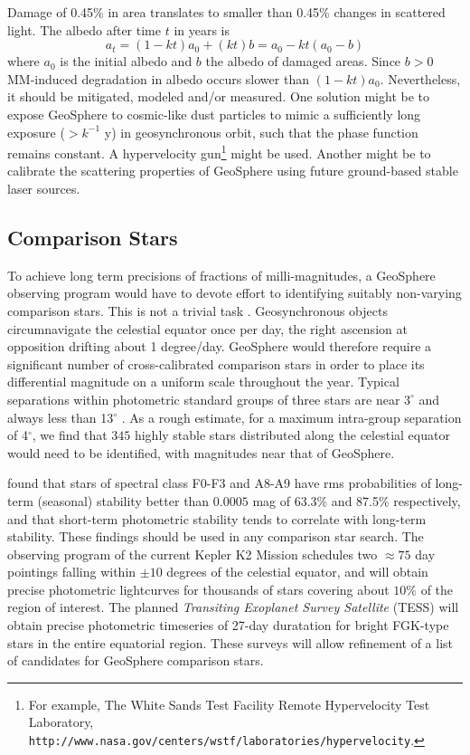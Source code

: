 \documentclass[useAMS,usenatbib]{mn2e}
\newcommand{\be}[1]{\begin{equation} \label{eq:#1}}
\newcommand{\ee}{\end{equation}}
\newcommand\name{LAMBERT}
\renewcommand\name{GeoSphere}
\begin{document}
Damage of 0.45\% in area translates to smaller than 0.45\% 
changes in scattered light.  
The albedo after time $t$ in years is
\be{change}
a_t = (1 - kt) a_0 + (kt) b = a_0 - kt(a_0-b)
\ee
%
where $a_0$ is the initial albedo and $b$ the albedo of damaged
areas.  Since $b > 0$ MM-induced degradation in albedo occurs slower than
$(1-kt) a_0$.  Nevertheless, it should be mitigated, modeled and/or
measured. One solution might be to expose \name{} to cosmic-like dust
particles to mimic a sufficiently long exposure ($>k^{-1}$ y) in
geosynchronous orbit, such that the phase function remains constant.
A hypervelocity gun\footnote{For example, The White Sands Test
  Facility Remote Hypervelocity Test Laboratory, {\tt
    http://www.nasa.gov/\-centers/wstf/laboratories/hypervelocity}.}
might be used.  Another might be to calibrate the scattering
properties of \name{} using future ground-based stable laser sources.

\subsection{Comparison Stars}

To achieve long term precisions
of fractions of milli-magnitudes, a \name{} observing program would
have to devote effort to identifying suitably non-varying comparison stars.
This is not a trivial task
\citep{Henry1999, Hall+others2009}.
Geosynchronous objects circumnavigate the celestial equator
 once per day, the right ascension at opposition
drifting about 1 degree/day. \name{} would therefore require a
significant number of cross-calibrated comparison stars in order to
place its differential magnitude on a uniform scale throughout the
year.  Typical separations within photometric standard groups of three
stars are near $3^\circ$ and always 
less than 13$^\circ$ \citep{Hall+others2007b,Lockwood+others2007}.
As a rough estimate, 
for a maximum intra-group separation of 4$^\circ$, we find that $345$
highly stable stars distributed along the celestial equator would need
to be identified, with magnitudes near that of \name{}.
                                                                               
\cite{Henry1999} found that stars of spectral class F0-F3 and A8-A9
have rms probabilities of long-term (seasonal) stability better than
$0.0005$ mag of 63.3\% and 87.5\% respectively, and that short-term
photometric stability tends to correlate with long-term stability.
These findings should be used in any comparison star search.  The
observing program of the current Kepler K2 Mission schedules two
$\approx75$ day pointings falling within $\pm 10$ degrees of the
celestial equator, and will obtain  precise photometric lightcurves for
thousands of stars covering about $10\%$ of the region of interest.
The planned \textit{Transiting Exoplanet
  Survey Satellite} (TESS) will obtain precise photometric timeseries
of 27-day duratation for bright FGK-type stars in the entire
equatorial region.  These surveys will allow refinement of a list of
candidates for \name{} comparison stars.
\end{document}
